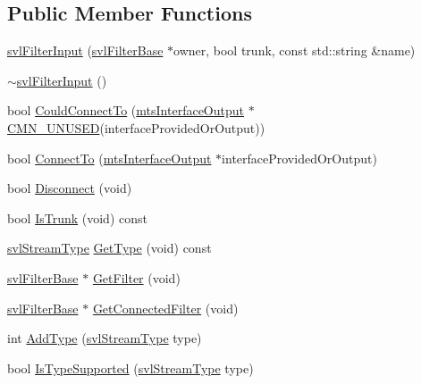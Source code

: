 \subsection*{Public Member Functions}
\begin{DoxyCompactItemize}
\item 
\hyperlink{classsvl_filter_input_ab6b16fc9e7c9e6fbe91cbd0a70da82f0}{svl\-Filter\-Input} (\hyperlink{classsvl_filter_base}{svl\-Filter\-Base} $\ast$owner, bool trunk, const std\-::string \&name)
\item 
\hyperlink{classsvl_filter_input_aeb4258ea93eda3b0d97439f7ef531582}{$\sim$svl\-Filter\-Input} ()
\item 
bool \hyperlink{classsvl_filter_input_ae7ed631fdd5ac5bb2da93b741406254b}{Could\-Connect\-To} (\hyperlink{classmts_interface_output}{mts\-Interface\-Output} $\ast$\hyperlink{cmn_portability_8h_a021894e2626935fa2305434b1e893ff6}{C\-M\-N\-\_\-\-U\-N\-U\-S\-E\-D}(interface\-Provided\-Or\-Output))
\item 
bool \hyperlink{classsvl_filter_input_a309b136a9f7f3ef6643aece60fd7d642}{Connect\-To} (\hyperlink{classmts_interface_output}{mts\-Interface\-Output} $\ast$interface\-Provided\-Or\-Output)
\item 
bool \hyperlink{classsvl_filter_input_a4379c85f8801cae52a207453705c0fe6}{Disconnect} (void)
\item 
bool \hyperlink{classsvl_filter_input_ace232638d7cb9a3d2b72557149be6e21}{Is\-Trunk} (void) const 
\item 
\hyperlink{svl_definitions_8h_aa00696d338a58db361335a01fd11e122}{svl\-Stream\-Type} \hyperlink{classsvl_filter_input_a2fea7997e88cbbf0220cd6d60b69b75a}{Get\-Type} (void) const 
\item 
\hyperlink{classsvl_filter_base}{svl\-Filter\-Base} $\ast$ \hyperlink{classsvl_filter_input_afd8b1db6cc2af54eb105556fea2d7133}{Get\-Filter} (void)
\item 
\hyperlink{classsvl_filter_base}{svl\-Filter\-Base} $\ast$ \hyperlink{classsvl_filter_input_ad9c36ed8272b0bb4b2ba0ad3221f99d7}{Get\-Connected\-Filter} (void)
\item 
int \hyperlink{classsvl_filter_input_a992069ef710fb16e136cee73b60f92c4}{Add\-Type} (\hyperlink{svl_definitions_8h_aa00696d338a58db361335a01fd11e122}{svl\-Stream\-Type} type)
\item 
bool \hyperlink{classsvl_filter_input_ae58d2e60c44b7454e083f0f3c3702f72}{Is\-Type\-Supported} (\hyperlink{svl_definitions_8h_aa00696d338a58db361335a01fd11e122}{svl\-Stream\-Type} type)
\item 

\end{DoxyCompactItemize}
